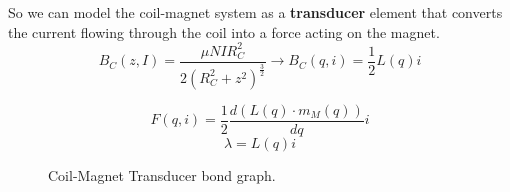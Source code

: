 So we can model the coil-magnet system as a \textbf{transducer} element that converts the current flowing through the coil into a force acting on the magnet.
\begin{equation*}
    B_C(z, I) = \frac{\mu N I R_C^2}{2(R_C^2+z^2)^\frac{3}{2}} \rightarrow B_C(q, i) = \frac{1}{2} L(q) i
\end{equation*}

\begin{figure}
    \centering
    \resizebox{.7\linewidth}{!}{
        
    }
    \caption{Coil-Magnet Transducer bond graph.}    
    \label{fig: Coil-Magnet_Transducer}
    
    \begin{equation*}
        F(q, i) = \frac{1}{2} \frac{d \left(L(q) \cdot m_M(q) \right)}{dq} i
    \end{equation*}
    \begin{equation*}
        \lambda = L(q) i
    \end{equation*}
\end{figure}
